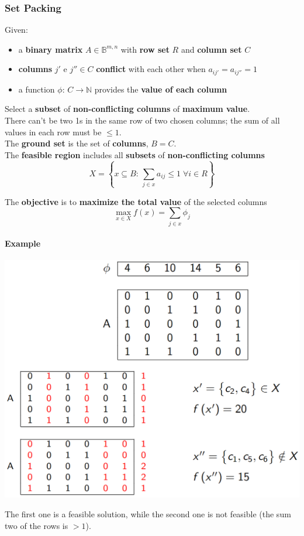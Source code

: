 \subsubsection{Set Packing}
Given:
\begin{itemize}
	\item a \textbf{binary matrix} $A \in \mathbb{B}^{m,n}$ with \textbf{row set} $R$ and \textbf{column set} $C$
	\item \textbf{columns} $j'$ e $j'' \in C$ \textbf{conflict} with each other when $a_{ij'} = a_{ij''} = 1$
	\item a function $\phi : \, C \rightarrow \mathbb{N}$ provides the \textbf{value of each column}
\end{itemize}
Select a \textbf{subset} of \textbf{non-conflicting columns} of \textbf{maximum value}.\\
There can't be two 1s in the same row of two chosen columns; the sum of all values in each row must be $\leq 1$.\\

The \textbf{ground set} is the set of \textbf{columns}, $B = C$.\\

The \textbf{feasible region} includes all \textbf{subsets} of \textbf{non-conflicting columns}
$$ X = \left\{x \subseteq B: \, \sum_{j \in x} a_{ij} \leq 1 \; \forall i \in R \right\}$$

The \textbf{objective} is to \textbf{maximize the total value} of the selected columns
$$ \max_{x \in X} f(x) = \sum_{j \in x} \phi_j $$

\newpage

\paragraph{Example}
\begin{center}
	\includegraphics[width=\columnwidth]{img/SetPacking1}
\end{center}
The first one is a feasible solution, while the second one is not feasible (the sum two of the rows is $>1$).\\

